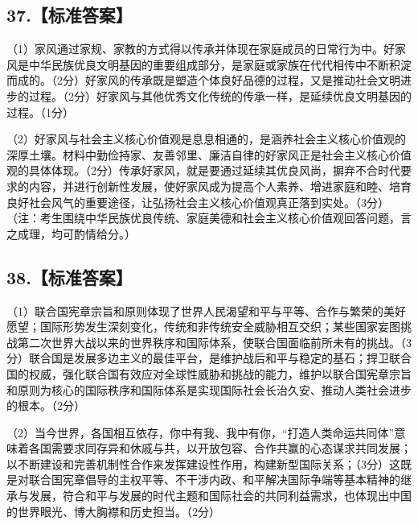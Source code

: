 \documentclass[UTF8,11pt]{ctexart}
\begin{document}
\subsection*{37.【标准答案】}

（1）家风通过家规、家教的方式得以传承并体现在家庭成员的日常行为中。好家风是中华民族优良文明基因的重要组成部分，是家庭或家族在代代相传中不断积淀而成的。（2分）好家风的传承既是塑造个体良好品德的过程，又是推动社会文明进步的过程。（2分）好家风与其他优秀文化传统的传承一样，是延续优良文明基因的过程。（1分）


（2）好家风与社会主义核心价值观是息息相通的，是涵养社会主义核心价值观的深厚土壤。材料中勤俭持家、友善邻里、廉洁自律的好家风正是社会主义核心价值观的具体体现。（2分）传承好家风，就是要通过延续其优良风尚，摒弃不合时代要求的内容，并进行创新性发展，使好家风成为提高个人素养、增进家庭和睦、培育良好社会风气的重要途径，让弘扬社会主义核心价值观真正落到实处。（3分）（注：考生围绕中华民族优良传统、家庭美德和社会主义核心价值观回答问题，言之成理，均可酌情给分。）


\subsection*{38.【标准答案】}

（1）联合国宪章宗旨和原则体现了世界人民渴望和平与平等、合作与繁荣的美好愿望；国际形势发生深刻变化，传统和非传统安全威胁相互交织；某些国家妄图挑战第二次世界大战以来的世界秩序和国际体系，使联合国面临前所未有的挑战。（3分）联合国是发展多边主义的最佳平台，是维护战后和平与稳定的基石；捍卫联合国的权威，强化联合国有效应对全球性威胁和挑战的能力，维护以联合国宪章宗旨和原则为核心的国际秩序和国际体系是实现国际社会长治久安、推动人类社会进步的根本。（2分）


（2）当今世界，各国相互依存，你中有我、我中有你，“打造人类命运共同体”意味着各国需要求同存异和休戚与共，以开放包容、合作共赢的心态谋求共同发展；以不断建设和完善机制性合作来发挥建设性作用，构建新型国际关系；（3分）这既是对联合国宪章倡导的主权平等、不干涉内政、和平解决国际争端等基本精神的继承与发展，符合和平与发展的时代主题和国际社会的共同利益需求，也体现出中国的世界眼光、博大胸襟和历史担当。（2分）
\end{document}
